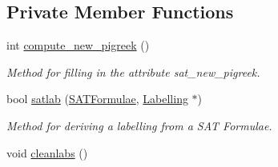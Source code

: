 \subsection*{Private Member Functions}
\begin{DoxyCompactItemize}
\item 
\hypertarget{classPreferred_af0e6b73b494712fa6a7161b5dc88b52a}{int \hyperlink{classPreferred_af0e6b73b494712fa6a7161b5dc88b52a}{compute\-\_\-new\-\_\-pigreek} ()}\label{classPreferred_af0e6b73b494712fa6a7161b5dc88b52a}

\begin{DoxyCompactList}\small\item\em Method for filling in the attribute sat\-\_\-new\-\_\-pigreek. \end{DoxyCompactList}\item 
bool \hyperlink{classPreferred_a6c2181d87c45714ea90ee69eb233d093}{satlab} (\hyperlink{classSATFormulae}{S\-A\-T\-Formulae}, \hyperlink{classLabelling}{Labelling} $\ast$)
\begin{DoxyCompactList}\small\item\em Method for deriving a labelling from a S\-A\-T Formulae. \end{DoxyCompactList}\item 
\hypertarget{classPreferred_a1dffeb709a014c7356cb074b7bae241c}{void \hyperlink{classPreferred_a1dffeb709a014c7356cb074b7bae241c}{cleanlabs} ()}\label{classPreferred_a1dffeb709a014c7356cb074b7bae241c}


\end{DoxyCompactItemize}
